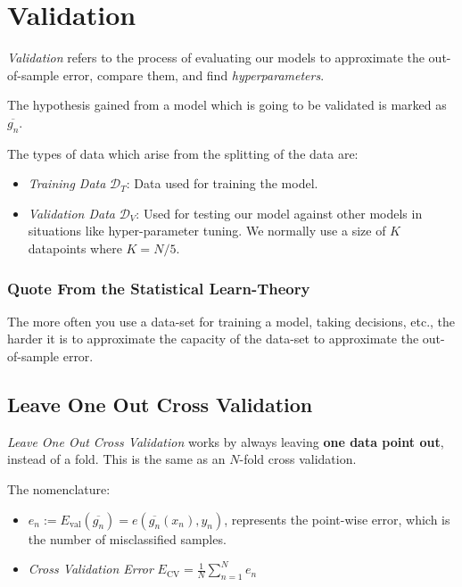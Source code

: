 \section{Validation}

\emph{Validation} refers to the process of evaluating our models to approximate the out-of-sample error, compare them, and find
\emph{hyperparameters}.

The hypothesis gained from a model which is going to be validated is marked as \(\overline{g_n}\).

The types of data which arise from the splitting of the data are:

\begin{itemize}

	\item \emph{Training Data} \(\mathcal{D}_T\): Data used for training the model.

	\item \emph{Validation Data} \(\mathcal{D}_V\): Used for testing our model against other models in situations like hyper-parameter tuning.
	We normally use a size of \(K\) datapoints where \(K = N/5\).

\end{itemize}

\subsubsection*{Quote From the Statistical Learn-Theory}

The more often you use a data-set for training a model, taking decisions, etc., the harder it is to approximate
the capacity of the data-set to approximate the out-of-sample error.

\subsection{Leave One Out Cross Validation}

\emph{Leave One Out Cross Validation} works by always leaving \textbf{one data point out}, instead of a fold.
This is the same as an \(N\)-fold cross validation.

The nomenclature:

\begin{itemize}

	\item \(e_n:= E_{\text{val}} (\overline{g_n}) = e(\overline{g_n}(x_n), y_n)\), represents the point-wise error,
	which is the number of misclassified samples.

	\item \emph{Cross Validation Error} \(E_{\text{CV}} = \frac{1}{N} \sum_{n = 1}^{N} e_n\)

\end{itemize}

